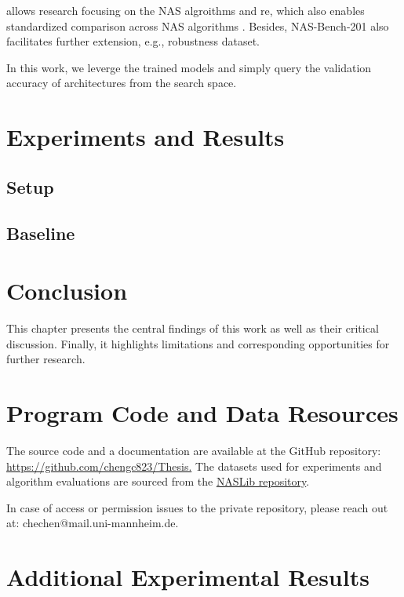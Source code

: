 \documentclass[a4paper,oneside,bibliography=totoc]{scrbook}
\begin{document}
allows research focusing on the NAS algroithms and re, which also enables standardized comparison across NAS algorithms . Besides, NAS-Bench-201 also facilitates further extension, e.g., robustness dataset.


In this work, we leverge the trained models and simply query the validation accuracy of architectures from the search space.


\chapter{Experiments and Results}
\section{Setup}
\section{Baseline}


\chapter{Conclusion}
\label{Conclude}
This chapter presents the central findings of this work as well as their critical discussion. Finally, it highlights limitations and corresponding opportunities for further research.






\appendix
\printglossary[type=\acronymtype, title=Acronyms]

\chapter{Program Code and Data Resources}
The source code and a documentation are available at the GitHub repository: \url{https://github.com/chengc823/Thesis.}
The datasets used for experiments and algorithm evaluations are sourced from the \href{https://github.com/automl/NASLib/tree/Develop}{NASLib repository}.

In case of access or permission issues to the private repository, please reach out at: chechen@mail.uni-mannheim.de.

\chapter{Additional Experimental Results}
\end{document}
